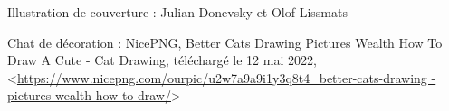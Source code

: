 \documentclass{article}
\begin{document}
    \begin{titlepage}
        
    \end{titlepage}

    \thispagestyle{empty}

    \tableofcontents
    
    \vfill
    
    \noindent Illustration de couverture : Julian Donevsky et Olof Lissmats
    
    \noindent Chat de décoration : NicePNG, Better Cats Drawing Pictures Wealth How To Draw A Cute - Cat Drawing, téléchargé le 12 mai 2022, <\url{https://www.nicepng.com/ourpic/u2w7a9a9i1y3q8t4_better-cats-drawing -pictures-wealth-how-to-draw/}>
\end{document}
